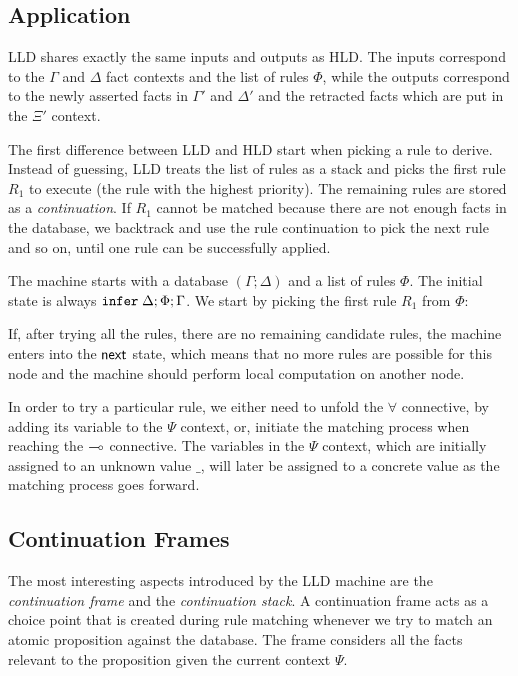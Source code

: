\subsection{Application}

LLD shares exactly the same inputs and outputs as HLD. The inputs correspond to
the $\Gamma$ and $\Delta$ fact contexts and the list of rules $\Phi$, while the
outputs correspond to the newly asserted facts in $\Gamma'$ and $\Delta'$ and
the retracted facts which are put in the $\Xi'$ context.

The first difference between LLD and HLD start when picking a rule to derive.
Instead of guessing, LLD treats the list of rules as a stack and picks the first
rule $R_1$ to execute (the rule with the highest priority). The remaining rules
are stored as a \emph{continuation}. If $R_1$ cannot be matched because there
are not enough facts in the database, we backtrack and use the rule continuation
to pick the next rule and so on, until one rule can be successfully applied.

The machine starts with a database $(\Gamma; \Delta)$ and a list of rules
$\Phi$. The initial state is always $\mathtt{infer} \; \Delta; \Phi; \Gamma$.
We start by picking the first rule $R_1$ from $\Phi$:



If, after trying all the rules, there are no remaining candidate rules, the
machine enters into the $\mathsf{next}$ state, which means that no more rules are
possible for this node and the machine should perform local computation on
another node.



In order to try a particular rule, we either need to unfold the $\forall$
connective, by adding its variable to the $\Psi$ context, or, initiate the matching
process when reaching the $\multimap$ connective. The variables in the $\Psi$
context, which are initially assigned to an unknown value $\_$, will later be
assigned to a concrete value as the matching process goes forward.




\subsection{Continuation Frames}

The most interesting aspects introduced by the LLD machine are the
\emph{continuation frame} and the \emph{continuation stack}. A continuation
frame acts as a choice point that is created during rule matching whenever we
try to match an atomic proposition against the database.  The frame considers
all the facts relevant to the proposition given the current context $\Psi$.

